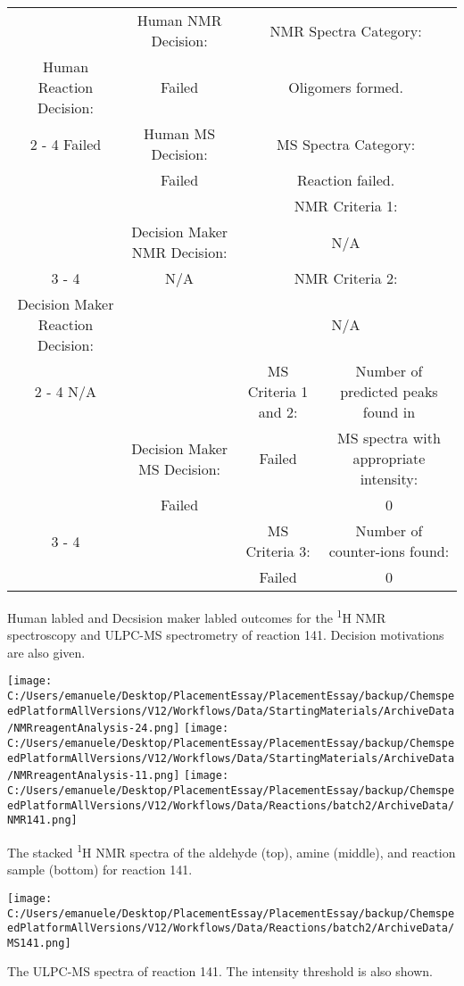 \documentclass{article}%
\begin{document}
\begin{Decision Table}[H]%
\begin{tabular}{|c|c|c|c|}%
\hline%
&Human NMR Decision:&\multicolumn{2}{|c|}{NMR Spectra Category:}\\%
Human Reaction Decision:&Failed&\multicolumn{2}{|c|}{Oligomers formed.}\\%
\cline{2%
-%
4}%
Failed&Human MS Decision:&\multicolumn{2}{|c|}{MS Spectra Category:}\\%
&Failed&\multicolumn{2}{|c|}{Reaction failed.}\\%
\hline%
&&\multicolumn{2}{|c|}{NMR Criteria 1:}\\%
&Decision Maker NMR Decision:&\multicolumn{2}{|c|}{N/A}\\%
\cline{3%
-%
4}%
&N/A&\multicolumn{2}{|c|}{NMR Criteria 2:}\\%
Decision Maker Reaction Decision:&&\multicolumn{2}{|c|}{N/A}\\%
\cline{2%
-%
4}%
N/A&&MS Criteria 1 and 2:&Number of predicted peaks found in\\%
&Decision Maker MS Decision:&Failed&MS spectra with appropriate intensity:\\%
&Failed&&0\\%
\cline{3%
-%
4}%
&&MS Criteria 3:&Number of counter{-}ions found:\\%
&&Failed&0\\%
\hline%
\end{tabular}%
\caption{Human labled and Decsision maker labled outcomes for the \textsuperscript{1}H NMR spectroscopy and ULPC-MS spectrometry of reaction 141. Decision motivations are also given.}%
\end{Decision Table}%
\begin{NMR Spectra}[H]%
\begin{center}%
\texttt{[image: C:/Users/emanuele/Desktop/PlacementEssay/PlacementEssay/backup/ChemspeedPlatformAllVersions/V12/Workflows/Data/StartingMaterials/ArchiveData/NMRreagentAnalysis-24.png]}\hfill%
\texttt{[image: C:/Users/emanuele/Desktop/PlacementEssay/PlacementEssay/backup/ChemspeedPlatformAllVersions/V12/Workflows/Data/StartingMaterials/ArchiveData/NMRreagentAnalysis-11.png]}\hfill%
\texttt{[image: C:/Users/emanuele/Desktop/PlacementEssay/PlacementEssay/backup/ChemspeedPlatformAllVersions/V12/Workflows/Data/Reactions/batch2/ArchiveData/NMR141.png]}\hfill%
\end{center}%
\caption{The stacked \textsuperscript{1}H NMR spectra of the aldehyde (top), amine (middle), and reaction sample (bottom) for reaction 141.}%
\end{NMR Spectra}%
\begin{MS Spectra}[H]%
\begin{center}%
\texttt{[image: C:/Users/emanuele/Desktop/PlacementEssay/PlacementEssay/backup/ChemspeedPlatformAllVersions/V12/Workflows/Data/Reactions/batch2/ArchiveData/MS141.png]}\hfill%
\end{center}%
\caption{The ULPC-MS spectra of reaction 141. The intensity threshold is also shown.}%
\end{MS Spectra}%
\end{document}
